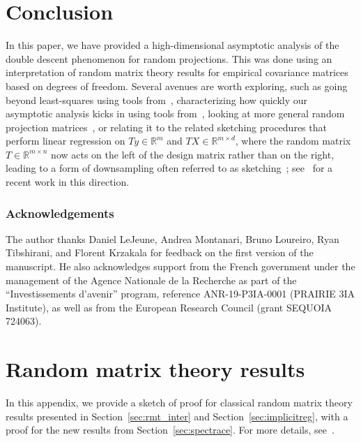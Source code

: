 \documentclass[11pt]{article}
\newcommand{\rb}{\mathbb{R}}
\newcommand{\mysec}[1]{Section~\ref{sec:#1}}
\begin{document}
 



\section{Conclusion}
In this paper, we have provided a high-dimensional asymptotic analysis of the double descent phenomenon for random projections. This was done using an interpretation of random matrix theory results for empirical covariance matrices based on degrees of freedom. Several avenues are worth exploring, such as going beyond least-squares using tools from~\cite{liao2021hessian,loureiro2022fluctuations}, characterizing how quickly our asymptotic analysis kicks in using tools from~\cite{bai2008clt}, looking at more general random projection matrices~\cite{lejeune2022asymptotics}, or relating it to the related sketching procedures that perform linear regression on $Ty \in \rb^{ m}$ and $TX \in \rb^{m \times d}$, where the random matrix $T \in \rb^{m \times n}$ now acts on the left of the design matrix rather than on the right, leading to a form of downsampling often referred to as sketching~\cite{dobriban2019asymptotics,raskutti2016statistical}; see~\cite{chen2023sketched} for a recent  work in this direction.



 \subsubsection*{Acknowledgements}
The author thanks Daniel LeJeune, Andrea Montanari, Bruno Loureiro, Ryan Tibshirani, and Florent Krzakala for feedback on the first version of the manuscript. He also  acknowledges support from the French government under the management of the Agence Nationale de la Recherche as part of the ``Investissements d’avenir'' program, reference
ANR-19-P3IA-0001 (PRAIRIE 3IA Institute), as well as from the European Research Council
(grant SEQUOIA 724063).

 
 \appendix

\section{Random matrix theory results}
In this appendix, we provide a sketch of proof for classical random matrix theory results presented in \mysec{rmt_inter} and \mysec{implicitreg}, with a proof for the new results from \mysec{spectrace}. For more details, see~\cite{silverstein1995empirical,bai2010spectral}.
\end{document}
